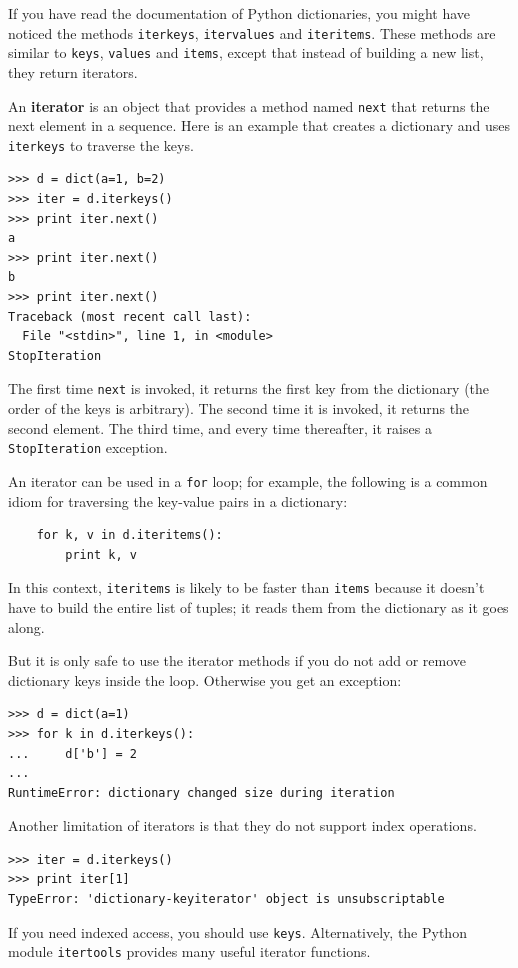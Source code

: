 \documentclass[10pt]{book}
\begin{document}
If you have read the documentation of Python dictionaries,
you might have noticed the methods {\tt iterkeys}, {\tt itervalues}
and {\tt iteritems}.  These methods are similar to {\tt keys},
{\tt values} and {\tt items}, except that instead of building
a new list, they return iterators.

An {\bf iterator} is an object that provides a method named
{\tt next} that returns the next element in a sequence.  Here
is an example that creates a dictionary and uses {\tt iterkeys}
to traverse the keys.
%
\begin{verbatim}
>>> d = dict(a=1, b=2)
>>> iter = d.iterkeys()
>>> print iter.next()
a
>>> print iter.next()
b
>>> print iter.next()
Traceback (most recent call last):
  File "<stdin>", line 1, in <module>
StopIteration
\end{verbatim}
%
The first time {\tt next} is invoked, it returns the first key from
the dictionary (the order of the keys is arbitrary).  The second
time it is invoked, it returns the second element.  The third time,
and every time thereafter, it raises a {\tt StopIteration}
exception.

An iterator can be used in a {\tt for} loop; for example, the
following is a common idiom for traversing the key-value
pairs in a dictionary:
%
\begin{verbatim}
    for k, v in d.iteritems():
        print k, v
\end{verbatim}
%
In this context, {\tt iteritems} is likely to be faster than
{\tt items} because it doesn't have to build the entire list
of tuples; it reads them from the dictionary as it goes along.

But it is only safe to use the iterator methods if you do not add or
remove dictionary keys inside the loop.  Otherwise you get an
exception:
%
\begin{verbatim}
>>> d = dict(a=1)
>>> for k in d.iterkeys():
...     d['b'] = 2
...
RuntimeError: dictionary changed size during iteration
\end{verbatim}
%
Another limitation of iterators is that they do not support index
operations.
%
\begin{verbatim}
>>> iter = d.iterkeys()
>>> print iter[1]
TypeError: 'dictionary-keyiterator' object is unsubscriptable
\end{verbatim}
%
If you need indexed access, you should use {\tt keys}.
Alternatively, the Python module {\tt itertools} provides
many useful iterator functions.
\end{document}
